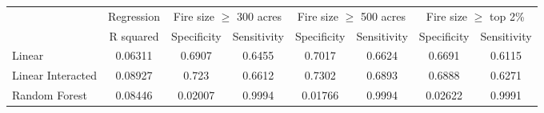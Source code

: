 \begin{tabular}{lccccccc}
\toprule
{} & Regression & \multicolumn{2}{c}{Fire size $\geq$ 300 acres} & \multicolumn{2}{c}{Fire size $\geq$ 500 acres} & \multicolumn{2}{c}{Fire size $\geq$ top 2\%} \\
{} &  R squared &            Specificity & Sensitivity &            Specificity & Sensitivity &         Specificity & Sensitivity \\
\midrule
Linear            &    0.06311 &                 0.6907 &      0.6455 &                 0.7017 &      0.6624 &              0.6691 &      0.6115 \\
Linear Interacted &    0.08927 &                  0.723 &      0.6612 &                 0.7302 &      0.6893 &              0.6888 &      0.6271 \\
Random Forest     &    0.08446 &                0.02007 &      0.9994 &                0.01766 &      0.9994 &             0.02622 &      0.9991 \\
\bottomrule
\end{tabular}
